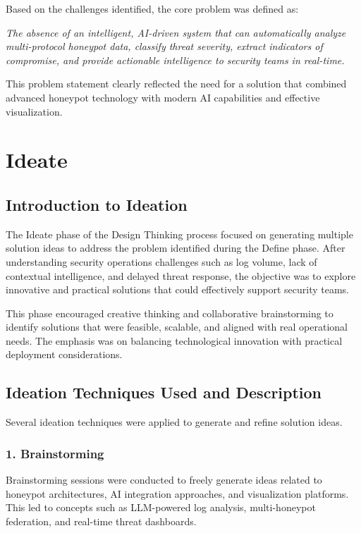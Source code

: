 \documentclass[12pt,a4paper]{report}
\begin{document}
Based on the challenges identified, the core problem was defined as:

\textit{The absence of an intelligent, AI-driven system that can automatically analyze multi-protocol honeypot data, classify threat severity, extract indicators of compromise, and provide actionable intelligence to security teams in real-time.}

This problem statement clearly reflected the need for a solution that combined advanced honeypot technology with modern AI capabilities and effective visualization.


\chapter{Ideate}
\thispagestyle{mainpages}

\section{Introduction to Ideation}

The Ideate phase of the Design Thinking process focused on generating multiple solution ideas to address the problem identified during the Define phase. After understanding security operations challenges such as log volume, lack of contextual intelligence, and delayed threat response, the objective was to explore innovative and practical solutions that could effectively support security teams.

This phase encouraged creative thinking and collaborative brainstorming to identify solutions that were feasible, scalable, and aligned with real operational needs. The emphasis was on balancing technological innovation with practical deployment considerations.

\section{Ideation Techniques Used and Description}

Several ideation techniques were applied to generate and refine solution ideas.

\subsection*{1. Brainstorming}

Brainstorming sessions were conducted to freely generate ideas related to honeypot architectures, AI integration approaches, and visualization platforms. This led to concepts such as LLM-powered log analysis, multi-honeypot federation, and real-time threat dashboards.
\end{document}
